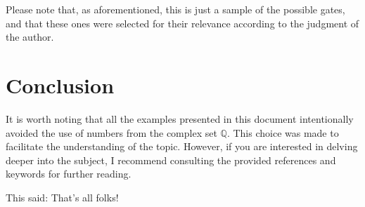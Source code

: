 			\par Please note that, as aforementioned, this is just a sample of the possible gates, and that these ones were selected for their relevance according to the judgment of the author.

	\section{Conclusion}
		\par It is worth noting that all the examples presented in this document intentionally avoided the use of numbers from the complex set $\mathbb{Q}$. This choice was made to facilitate the understanding of the topic. However, if you are interested in delving deeper into the subject, I recommend consulting the provided references and keywords for further reading.
		
		\par This said: That's all folks!	
	
	
